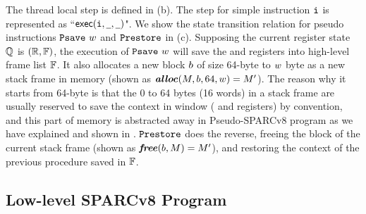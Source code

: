 The thread local step is defined in
\Fig{\ref{fig:selected-opsem-high-level-prog}} (b).
The step for simple instruction $\texttt{i}{}$ is
represented as ``$\textsf{exec}({\texttt{i}{}}, {\underline{\ \,}}, {\underline{\ \,}})$".
We show the state transition relation for pseudo instructions
$\texttt{Psave} \ w$ and $\texttt{Prestore}$ in
\Fig{\ref{fig:selected-opsem-high-level-prog}} (c).
Supposing the current register state $\mathbb{Q}$ is
$(\mathbb{R}, \mathbb{F})$, the execution of
$\texttt{Psave} \ w$ will save the \localRN{} and \inRN{} registers
into high-level frame list $\mathbb{F}$. It also allocates
a new block $b$ of size 64-byte to $w$ byte
as a new stack frame in memory
(shown as $\textbf{\textit{alloc}}(M, b, 64, w) = M'$).
The reason why it starts from 64-byte is that the 0 to 64 bytes
(16 words) in a stack frame are usually reserved to save
the context in window (\localRN{} and \inRN{} registers)
by convention,
and this part of memory is abstracted away in
Pseudo-SPARCv8 program as we have explained and shown in
\Fig{\ref{fig:Abstraction of Register Windows and Memory}}.
$\texttt{Prestore}$ does the reverse,
freeing the block of the current stack frame
(shown as $\textbf{\textit{free}}(b, M) = M'$), and
restoring the context of the previous procedure
saved in $\mathbb{F}$.

\subsection{Low-level SPARCv8 Program}
\label{subsec:low-level SPARCv8 Program}


